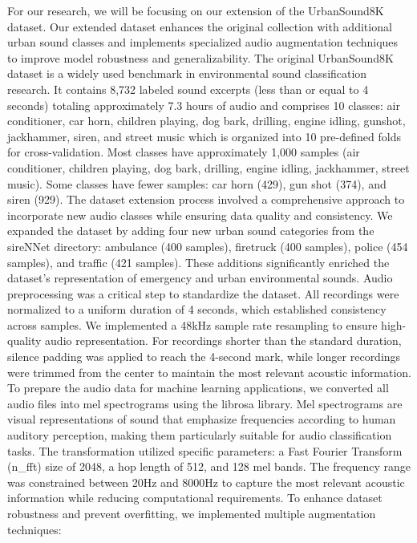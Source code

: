\documentclass[11pt]{article}
\begin{document}
For our research, we will be focusing on our extension of the UrbanSound8K dataset. Our extended dataset enhances the original collection with additional urban sound classes and implements specialized audio augmentation techniques to improve model robustness and generalizability. The original UrbanSound8K dataset is a widely used benchmark in environmental sound classification research. It contains 8,732 labeled sound excerpts (less than or equal to 4 seconds) totaling approximately 7.3 hours of audio and comprises 10 classes: air conditioner, car horn, children playing, dog bark, drilling, engine idling, gunshot, jackhammer, siren, and street music which is organized into 10 pre-defined folds for cross-validation. Most classes have approximately 1,000 samples (air conditioner, children playing, dog bark, drilling, engine idling, jackhammer, street music). Some classes have fewer samples: car horn (429), gun shot (374), and siren (929).
The dataset extension process involved a comprehensive approach to incorporate new audio classes while ensuring data quality and consistency. We expanded the dataset by adding four new urban sound categories from the sireNNet directory: ambulance (400 samples), firetruck (400 samples), police (454 samples), and traffic (421 samples). These additions significantly enriched the dataset's representation of emergency and urban environmental sounds. Audio preprocessing was a critical step to standardize the dataset. All recordings were normalized to a uniform duration of 4 seconds, which established consistency across samples. We implemented a 48kHz sample rate resampling to ensure high-quality audio representation. For recordings shorter than the standard duration, silence padding was applied to reach the 4-second mark, while longer recordings were trimmed from the center to maintain the most relevant acoustic information. To prepare the audio data for machine learning applications, we converted all audio files into mel spectrograms using the librosa library. Mel spectrograms are visual representations of sound that emphasize frequencies according to human auditory perception, making them particularly suitable for audio classification tasks. The transformation utilized specific parameters: a Fast Fourier Transform (n\_fft) size of 2048, a hop length of 512, and 128 mel bands. The frequency range was constrained between 20Hz and 8000Hz to capture the most relevant acoustic information while reducing computational requirements.
To enhance dataset robustness and prevent overfitting, we implemented multiple augmentation techniques:
\end{document}
